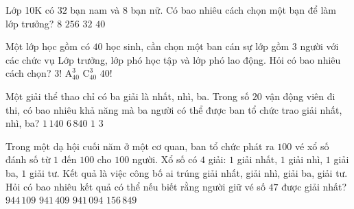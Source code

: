 \begin{ex}%
	Lớp 10K có $ 32 $  bạn nam và $ 8 $ bạn nữ. Có bao nhiêu cách chọn một bạn để làm lớp trưởng?
	\choice 
		 {$ 8 $}
		{$ 256 $} 
		{$  32 $}
		{\True  $ 40 $}
\end{ex}

\begin{ex}%
	Một lớp học gồm có $40$ học sinh, cần chọn một ban cán sự lớp gồm $3$ người với  các chức vụ Lớp trưởng, lớp phó học tập và lớp phó lao động. Hỏi có bao nhiêu cách chọn?
	\choice 
		 {$3!$}
		 {\True $\mathrm{A}_{40}^3$}
		{$\mathrm{C}_{40}^3$} 
		{$40!$} 
\end{ex}

\begin{ex}%
	Một giải thể thao chỉ có ba giải là nhất, nhì, ba.  Trong số $20$ vận động viên đi thi, có bao nhiêu khả năng mà ba người có thể được ban tổ chức trao giải nhất, nhì, ba?
	\choice 
		 {$1\,140$}
		{\True  $6\,840$}
		{$1$} 
		{$3$} 
\end{ex}

\begin{ex}%
	Trong một dạ hội cuối năm ở một cơ quan, ban tổ chức phát ra $100$ vé xổ số đánh số từ $1$ đến $100$ cho $100$ người. Xổ số có $4$ giải: $1$ giải  nhất, $1$ giải nhì, $1$ giải ba, $1$ giải tư. Kết quả là việc công bố ai trúng giải nhất, giải nhì, giải ba, giải tư. Hỏi có bao nhiêu kết quả có thể nếu biết rằng người giữ vé số $47$ được giải nhất?
	\choice 
		 {\True $944\,109$}
		 {$941\,409$}
		{$941\,094$} 
		{$156\,849$} 
\end{ex}

